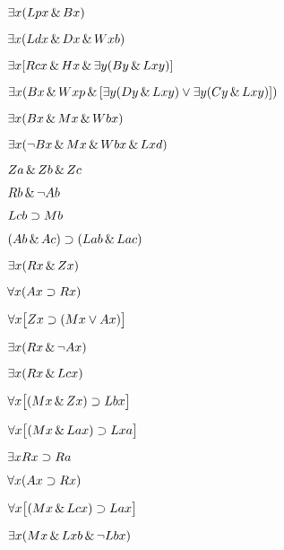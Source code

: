 \begin{earg}
\item %
$\exists x (Lpx \,\&\, Bx)$
\item %
$\exists x (Ldx \,\&\, Dx \,\&\, Wxb)$
\item %
$\exists x [Rcx \,\&\, Hx \,\&\, \exists y (By \,\&\, Lxy)]$
\item %
$\exists x (Bx \,\&\, Wxp \,\&\, [\exists y (Dy \,\&\, Lxy) \vee \exists y (Cy \,\&\, Lxy)])$
\item %
$\exists x (Bx \,\&\, Mx \,\&\, Wbx)$
\item %
$\exists x (\neg Bx \,\&\, Mx \,\&\, Wbx \,\&\, Lxd)$
\end{earg}

\begin{earg}
\item %
$Za \,\&\, Zb \,\&\, Zc$
\item %
$Rb \,\&\, \neg Ab$
\item %
$Lcb \supset Mb$
\item %
$(Ab \,\&\, Ac)\supset(Lab \,\&\, Lac)$
\item %
$\exists x(Rx \,\&\, Zx)$
\item %
$\forall x(Ax \supset Rx)$
\item %
$\forall x\bigl[Zx \supset (Mx \vee Ax)\bigr]$
\item %
$\exists x(Rx \,\&\, \neg Ax)$
\item %
$\exists x(Rx \,\&\, Lcx)$
\item %
$\forall x\bigl[(Mx \,\&\, Zx) \supset Lbx\bigr]$
\item %
$\forall x\bigl[(Mx \,\&\, Lax) \supset Lxa\bigr]$
\item %
$\exists x Rx \supset Ra$
\item %
$\forall x(Ax \supset Rx)$
\item %
$\forall x\bigl[(Mx \,\&\, Lcx) \supset Lax\bigr]$
\item %
$\exists x(Mx \,\&\, Lxb \,\&\, \neg Lbx)$
\end{earg}

